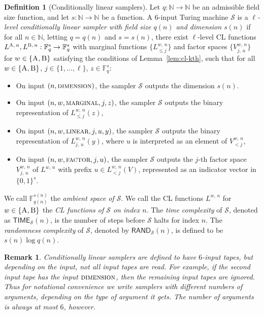 \documentclass[11pt]{article}
\newtheorem{remark}[theorem]{Remark}
\theoremstyle{definition}
\newtheorem{definition}[theorem]{Definition}
\newcommand{\N}{\ensuremath{\mathbb{N}}}
\newcommand{\F}{\ensuremath{\mathbb{F}}}
\newcommand{\sampler}{\mathcal{S}}
\newcommand{\gamestyle}[1]{\ensuremath{\textsc{#1}}\xspace}
\newcommand{\labelstyle}[1]{\ensuremath{\textsc{#1}}\xspace}
\newcommand{\alice}{\labelstyle{A}}
\newcommand{\bob}{\labelstyle{B}}
\newcommand{\ab}{\{\alice, \bob\}}
\newcommand{\AB}{\{\alice, \bob\}}
\newcommand{\TIME}{\mathsf{TIME}}
\newcommand{\RAND}{\mathsf{RAND}}
\begin{document}
\begin{definition}[Conditionally linear samplers]
  \label{def:sampler}
	Let $q:\N \to \N$ be an admissible field size function, and let $s: \N \to \N$
  be a function.
  A $6$-input Turing machine $\sampler$ is a \emph{$\ell$-level conditionally
    linear sampler with field size $q(n)$ and dimension $s(n)$} if for all $n
  \in \N$, letting $q = q(n)$ and $s = s(n)$, there exist $\ell$-level CL
  functions $L^{\alice,\, n}, L^{\bob,\, n} : \F_q^s \to \F_q^s$ with marginal functions
  $\{ L^{w,\, n}_{\leq j}\}$ and factor spaces $\{V^{w,\, n}_{j,\, u}\}$ for $w \in \AB$
  satisfying the conditions of Lemma~\ref{lem:cl-kth}, such that for all $w \in
  \AB$, $j \in \{1,\ldots,\ell\}$, $z \in \F_q^s$:
  \begin{itemize}
  \item On input $(n, \gamestyle{dimension})$, the sampler $\sampler$ outputs the
    dimension $s(n)$.
  \item On input $(n, w, \gamestyle{marginal}, j, z)$, the sampler $\sampler$
    outputs the binary representation of $L^{w,\, n}_{\leq j}(z)$,
	 \item On input $(n, w, \gamestyle{linear}, j, u, y)$, the sampler $\sampler$
    outputs the binary representation of $L^{w,\, n}_{j,\, u}(y)$, where $u$ is
    interpreted as an element of $V^{w,\, n}_{<j}$,
	\item On input $(n, w, \gamestyle{factor}, j, u)$, the sampler $\sampler$
    outputs the $j$-th factor space $V^{w,\, n}_{j,\, u}$ of $L^{w,\, n}$ with
    prefix $u \in L^{w,\, n}_{<j}(V)$, represented as an indicator vector in
    $\{0,1\}^s$.
  \end{itemize}
  We call $\F_{q(n)}^{s(n)}$ the \emph{ambient space of $\sampler$}.
  We call the CL functions $L^{w,\, n}$ for $w \in \ab$ the \emph{CL functions
    of $\sampler$ on index $n$}.
  The \emph{time complexity} of $\sampler$, denoted as $\TIME_\sampler(n)$, is
  the number of steps before $\sampler$ halts for index $n$.
  The \emph{randomness complexity} of $\sampler$, denoted by
  $\RAND_\sampler(n)$, is defined to be $s(n) \log q(n)$.
\end{definition}

\begin{remark}
\label{rmk:sampler-inputs}
Conditionally linear samplers are defined to have $6$-input tapes, but depending on the input, not all input tapes are read. For example, if the second input tape has the input $\gamestyle{dimension}$, then the remaining input tapes are ignored. Thus for notational convenience we write samplers with different numbers of arguments, depending on the type of argument it gets. The number of arguments is always at most $6$, however.
\end{remark}
\end{document}

